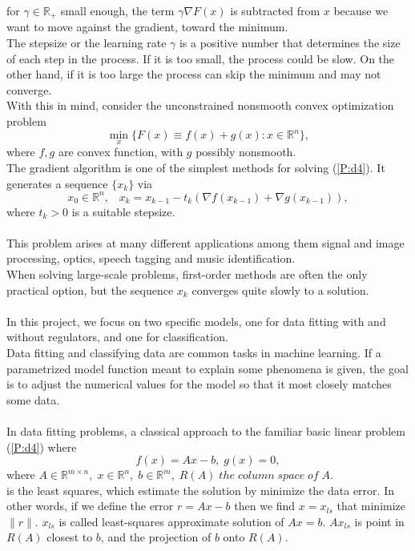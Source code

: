 \documentclass[12pt]{article}
\begin{document}
for $\gamma \in \mathbb{R}_+$ small enough, the term $\gamma \nabla F(x)$  is subtracted from $x$  because we want to move against the gradient, toward the minimum. \\
The stepsize or the learning rate $\gamma$ is a positive number that determines the size of each step in the process.
If it is too small, the process could be slow. On the other hand, if it is too large the process can skip the minimum and may not converge.
\\With this in mind, consider the unconstrained nonsmooth convex optimization problem
\begin{equation}\label{P:d4}
\min_x \{F(x) \equiv f(x) + g(x):x \in \mathbb{R}^n\}, 
\end{equation}
where $f,g$ are convex function, with $g$ possibly nonsmooth. \\
The gradient algorithm is one of the simplest methods for solving (\ref{P:d4}). It generates a sequence $\{ x_k \}$ via
$$x_0 \in \mathbb{R}^n, \;\;\; x_k = x_{k-1} -t_k (\nabla f(x_{k-1})+ \nabla g(x_{k-1})),$$
where $t_k>0$ is a suitable stepsize.\\
\\This problem arises at many different applications among them signal and image processing, optics, speech tagging and music identification. \\
When solving large-scale problems, first-order methods are often the only practical option, but the sequence ${x_k}$ converges quite slowly to a solution.\\
\\In this project, we focus on two specific models, one for data fitting with and without regulators, and one for classification. \\
Data fitting and classifying data are common tasks in machine learning.
If a parametrized model function meant to explain some phenomena is given, the goal is to adjust the numerical values for the model so that it most closely matches some data.\\
\\In data fitting problems, a classical approach to the familiar basic linear problem (\ref{P:d4}) where
$$f(x) =Ax-b,\;g(x)=0,$$
where $A\in \mathbb{R}^{m\times n},\;x \in \mathbb{R}^n,\;b\in \mathbb{R}^m,\;R(A)\;the\;column\;space\;of\;A.$\\
is the least squares, which estimate the solution by minimize the data error. In other words, if we define the error $r=Ax-b$ then we find $x=x_{ls}$ that minimize $\|r\|$. $x_{ls}$ is called least-squares approximate solution of $Ax=b$. $Ax_{ls}$ is point in $R(A)$ closest to $b$, and the projection of $b$ onto $R(A)$.
\end{document}
